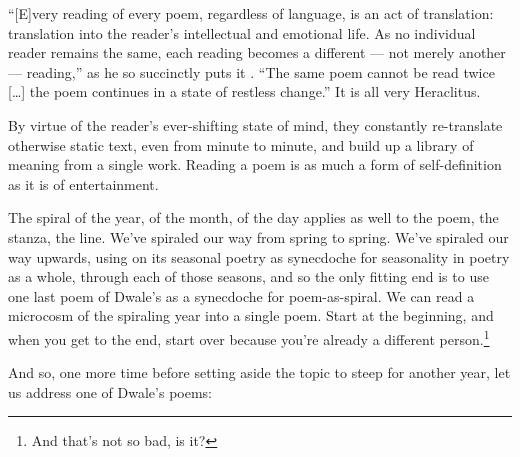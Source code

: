 ``{[E]}very reading of every poem, regardless of language, is an act of translation: translation into the reader's intellectual and emotional life. As no individual reader remains the same, each reading becomes a different --- not merely another --- reading,'' as he so succinctly puts it \parencite[46]{wangwei}. ``The same poem cannot be read twice {[\ldots]} the poem continues in a state of restless change.'' It is all very Heraclitus.

By virtue of the reader's ever-shifting state of mind, they constantly re-translate otherwise static text, even from minute to minute, and build up a library of meaning from a single work. Reading a poem is as much a form of self-definition as it is of entertainment.

The spiral of the year, of the month, of the day applies as well to the poem, the stanza, the line. We've spiraled our way from spring to spring. We've spiraled our way upwards, using on its seasonal poetry as synecdoche for seasonality in poetry as a whole, through each of those seasons, and so the only fitting end is to use one last poem of Dwale's as a synecdoche for poem-as-spiral. We can read a microcosm of the spiraling year into a single poem. Start at the beginning, and when you get to the end, start over because you're already a different person.\footnote{And that's not so bad, is it?}

And so, one more time before setting aside the topic to steep for another year, let us address one of Dwale's poems:

